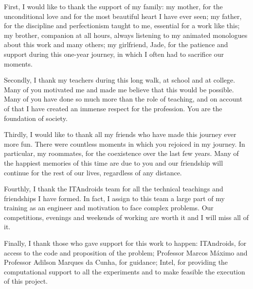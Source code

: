 First, I would like to thank the support of my family: my mother, for the unconditional love and for the most beautiful heart I have ever seen; my father, for the discipline and perfectionism taught to me, essential for a work like this; my brother, companion at all hours, always listening to my animated monologues about this work and many others; my girlfriend, Jade, for the patience and support during this one-year journey, in which I often had to sacrifice our moments.

Secondly, I thank my teachers during this long walk, at school and at college. Many of you motivated me and made me believe that this would be possible. Many of you have done so much more than the role of teaching, and on account of that I have created an immense respect for the profession. You are the foundation of society.

Thirdly, I would like to thank all my friends who have made this journey ever more fun. There were countless moments in which you rejoiced in my journey. In particular, my roommates, for the coexistence over the last few years. Many of the happiest memories of this time are due to you and our friendship will continue for the rest of our lives, regardless of any distance.

Fourthly, I thank the ITAndroids team for all the technical teachings and friendships I have formed. In fact, I assign to this team a large part of my training as an engineer and motivation to face complex problems. Our competitions, evenings and weekends of working are worth it and I will miss all of it.

Finally, I thank those who gave support for this work to happen: ITAndroids, for access to the code and proposition of the problem; Professor Marcos Máximo and Professor Adilson Marques da Cunha, for guidance; Intel, for providing the computational support to all the experiments and to make feasible the execution of this project.